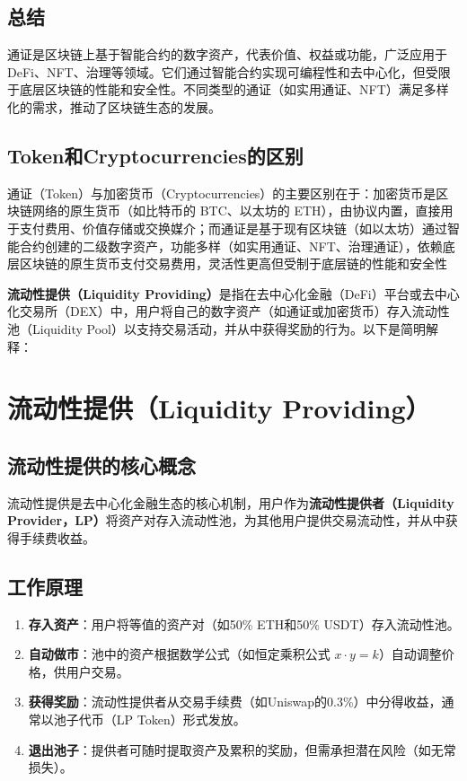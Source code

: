 \documentclass[12pt]{ctexart}
\begin{document}
\subsection{总结}
通证是区块链上基于智能合约的数字资产，代表价值、权益或功能，广泛应用于 DeFi、NFT、治理等领域。它们通过智能合约实现可编程性和去中心化，但受限于底层区块链的性能和安全性。不同类型的通证（如实用通证、NFT）满足多样化的需求，推动了区块链生态的发展。

\subsection{Token和Cryptocurrencies的区别}
通证（Token）与加密货币（Cryptocurrencies）的主要区别在于：加密货币是区块链网络的原生货币（如比特币的 BTC、以太坊的 ETH），由协议内置，直接用于支付费用、价值存储或交换媒介；而通证是基于现有区块链（如以太坊）通过智能合约创建的二级数字资产，功能多样（如实用通证、NFT、治理通证），依赖底层区块链的原生货币支付交易费用，灵活性更高但受制于底层链的性能和安全性

\textbf{流动性提供（Liquidity Providing）}是指在去中心化金融（DeFi）平台或去中心化交易所（DEX）中，用户将自己的数字资产（如通证或加密货币）存入流动性池（Liquidity Pool）以支持交易活动，并从中获得奖励的行为。以下是简明解释：

\newpage
\section{流动性提供（Liquidity Providing）}

\subsection{流动性提供的核心概念}
流动性提供是去中心化金融生态的核心机制，用户作为\textbf{流动性提供者（Liquidity \\Provider，LP）}将资产对存入流动性池，为其他用户提供交易流动性，并从中获得手续费收益。

\subsection{工作原理}
\begin{enumerate}
  \item \textbf{存入资产}：用户将等值的资产对（如50\% ETH和50\% USDT）存入流动性池。
  \item \textbf{自动做市}：池中的资产根据数学公式（如恒定乘积公式 $x \cdot y = k$）自动调整价格，供用户交易。
  \item \textbf{获得奖励}：流动性提供者从交易手续费（如Uniswap的0.3\%）中分得收益，通常以池子代币（LP Token）形式发放。
  \item \textbf{退出池子}：提供者可随时提取资产及累积的奖励，但需承担潜在风险（如无常损失）。
\end{enumerate}
\end{document}
